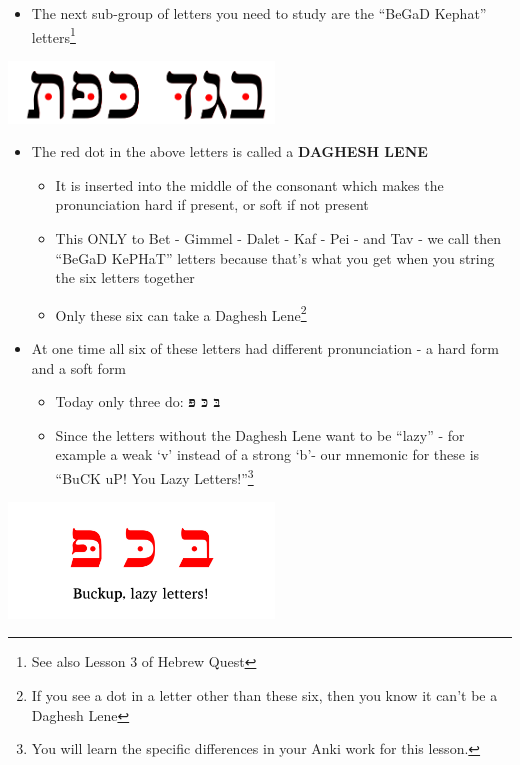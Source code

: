 \documentclass[
]{turabian-researchpaper}
\providecommand{\tightlist}{%
  \setlength{\itemsep}{0pt}\setlength{\parskip}{0pt}}
\begin{document}
\begin{itemize}
\tightlist
\item
  The next sub-group of letters you need to study are the ``BeGaD Kephat'' letters\footnote{See also Lesson 3 of Hebrew Quest}
\end{itemize}

\begin{center}\includegraphics[width=200pt]{images/bdgkpt_with_lene} \end{center}

\begin{itemize}
\tightlist
\item
  The red dot in the above letters is called a \textbf{DAGHESH LENE}

  \begin{itemize}
  \tightlist
  \item
    It is inserted into the middle of the consonant which makes the pronunciation hard if present, or soft if not present
  \item
    This ONLY to Bet - Gimmel - Dalet - Kaf - Pei - and Tav - we call then ``BeGaD KePHaT'' letters because that's what you get when you string the six letters together
  \item
    Only these six can take a Daghesh Lene\footnote{If you see a dot in a letter other than these six, then you know it can't be a Daghesh Lene}
  \end{itemize}
\item
  At one time all six of these letters had different pronunciation - a hard form and a soft form

  \begin{itemize}
  \tightlist
  \item
    Today only three do: \textbf{בּ כּ פּ}
  \item
    Since the letters without the Daghesh Lene want to be ``lazy'' - for example a weak `v' instead of a strong `b'- our mnemonic for these is ``BuCK uP! You Lazy Letters!''\footnote{You will learn the specific differences in your Anki work for this lesson.}
  \end{itemize}
\end{itemize}

\begin{center}\includegraphics[width=200pt]{images/buckup} \end{center}
\end{document}
